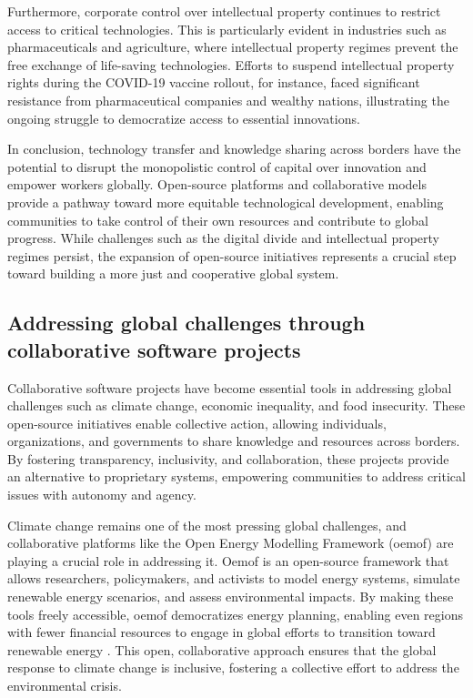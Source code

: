 \begin{refsection}
Furthermore, corporate control over intellectual property continues to restrict access to critical technologies. This is particularly evident in industries such as pharmaceuticals and agriculture, where intellectual property regimes prevent the free exchange of life-saving technologies. Efforts to suspend intellectual property rights during the COVID-19 vaccine rollout, for instance, faced significant resistance from pharmaceutical companies and wealthy nations, illustrating the ongoing struggle to democratize access to essential innovations.

In conclusion, technology transfer and knowledge sharing across borders have the potential to disrupt the monopolistic control of capital over innovation and empower workers globally. Open-source platforms and collaborative models provide a pathway toward more equitable technological development, enabling communities to take control of their own resources and contribute to global progress. While challenges such as the digital divide and intellectual property regimes persist, the expansion of open-source initiatives represents a crucial step toward building a more just and cooperative global system.

\subsection{Addressing global challenges through collaborative software projects}

Collaborative software projects have become essential tools in addressing global challenges such as climate change, economic inequality, and food insecurity. These open-source initiatives enable collective action, allowing individuals, organizations, and governments to share knowledge and resources across borders. By fostering transparency, inclusivity, and collaboration, these projects provide an alternative to proprietary systems, empowering communities to address critical issues with autonomy and agency.

Climate change remains one of the most pressing global challenges, and collaborative platforms like the Open Energy Modelling Framework (oemof) are playing a crucial role in addressing it. Oemof is an open-source framework that allows researchers, policymakers, and activists to model energy systems, simulate renewable energy scenarios, and assess environmental impacts. By making these tools freely accessible, oemof democratizes energy planning, enabling even regions with fewer financial resources to engage in global efforts to transition toward renewable energy \cite[pp.~14-16]{pfenningermodeling}. This open, collaborative approach ensures that the global response to climate change is inclusive, fostering a collective effort to address the environmental crisis.


\end{refsection}
